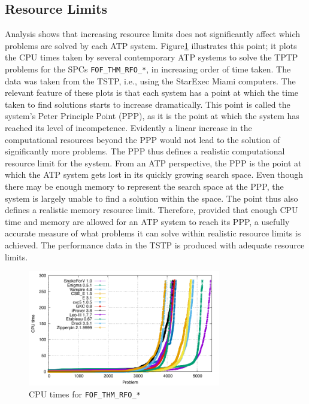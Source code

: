 \documentclass[runningheads]{llncs}
\begin{document}
\subsection{Resource Limits}
\label{ResourceLimits}

Analysis shows that increasing resource limits does not significantly affect which problems 
are solved by each ATP system. 
Figure\ref{PPPPlot} illustrates this point; it plots the CPU times taken by several contemporary 
ATP systems to solve the TPTP problems for the SPCs {\tt FOF\_THM\_RFO\_*}, in increasing order 
of time taken. 
The data was taken from the TSTP, i.e., using the StarExec Miami computers.
The relevant feature of these plots is that each system has a point at which the time taken to 
find solutions starts to increase dramatically. 
This point is called the system's Peter Principle \cite{PH69} Point (PPP), as it is the point at 
which the system has reached its level of incompetence. 
Evidently a linear increase in the computational resources beyond the PPP would not lead to the 
solution of significantly more problems. 
The PPP thus defines a realistic computational resource limit for the system. 
From an ATP perspective, the PPP is the point at which the ATP system gets lost in its quickly 
growing search space. 
Even though there may be enough memory to represent the search space at the PPP, the system is 
largely unable to find a solution within the space. 
The point thus also defines a realistic memory resource limit. 
Therefore, provided that enough CPU time and memory are allowed for an ATP system to reach its 
PPP, a usefully accurate measure of what problems it can solve within realistic resource limits 
is achieved.
The performance data in the TSTP is produced with adequate resource limits.

\begin{figure}[ht!]
\centering
\includegraphics[width=0.75\textwidth]{Plots/FOF_THM_RFO_PPP/FOF_THM_RFO_PPP}
\vspace*{-1em}
\caption{CPU times for {\tt FOF\_THM\_RFO\_*}}
\label{PPPPlot}
\end{figure}
\end{document}
